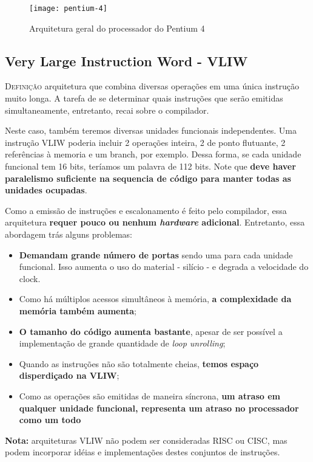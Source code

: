 \begin{figure}[ht]
  \centering
  \texttt{[image: pentium-4]}
  \caption{Arquitetura geral do processador do Pentium 4  }
  \label{fig:pentium4}
\end{figure}


\subsection{Very Large Instruction Word - VLIW}
\textsc{Definição} arquitetura que combina diversas operações em uma única instrução muito longa. A tarefa de se determinar quais instruções que serão emitidas simultaneamente, entretanto, recai sobre o compilador.

Neste caso, também teremos diversas unidades funcionais independentes. Uma instrução VLIW poderia incluir 2 operações inteira, 2 de ponto flutuante, 2 referências à memoria e um branch, por exemplo. Dessa forma, se cada unidade funcional tem 16 bits, teríamos um palavra de 112 bits. Note que \textbf{deve haver paralelismo suficiente na sequencia de código para manter todas as unidades ocupadas}.

Como a emissão de instruções e escalonamento é feito pelo compilador, essa arquitetura \textbf{requer pouco ou nenhum \textit{hardware} adicional}. Entretanto, essa abordagem trás alguns problemas:
\begin{itemize}
  \item \textbf{Demandam grande número de portas} sendo uma para cada unidade funcional. Isso aumenta o uso do material - silício - e degrada a velocidade do clock.

  \item Como há múltiplos acessos simultâneos à memória, \textbf{a complexidade da memória também aumenta};

  \item \textbf{O tamanho do código aumenta bastante}, apesar de ser possível a implementação de grande quantidade de \textit{loop unrolling};

  \item Quando as instruções não são totalmente cheias, \textbf{temos espaço disperdiçado na VLIW};

  \item Como as operações são emitidas de maneira síncrona, \textbf{um atraso em qualquer unidade funcional, representa um atraso no processador como um todo}
\end{itemize}

\textbf{Nota:} arquiteturas VLIW não podem ser consideradas RISC ou CISC, mas podem incorporar idéias e implementações destes conjuntos de instruções.



